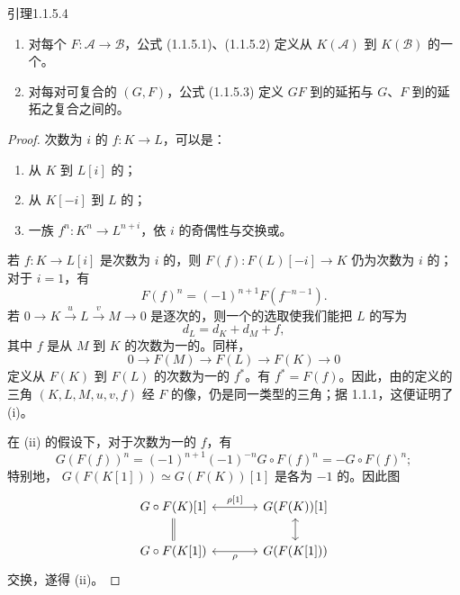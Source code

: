 \begin{SGAresult}{引理}{1.1.5.4}
\begin{enumerate}
\item[(i)] 对每个 $F:\mathcal A\to\mathcal B$，公式 (1.1.5.1)、(1.1.5.2) 定义从 $K(\mathcal A)$ 到 $K(\mathcal B)$ 的一个。
\item[(ii)] 对每对可复合的 $(G,F)$，公式 (1.1.5.3) 定义 $GF$ 到的延拓与 $G$、$F$ 到的延拓之复合之间的。
\end{enumerate}
\end{SGAresult}
\begin{proof}
次数为 $i$ 的 $f:K\to L$，可以是：
\begin{enumerate}
\item[(a)] 从 $K$ 到 $L[i]$ 的；
\item[(b)] 从 $K[-i]$ 到 $L$ 的；
\item[(c)] 一族 $f^n:K^n\to L^{n+i}$，依 $i$ 的奇偶性与交换或。
\end{enumerate}
若 $f:K\to L[i]$ 是次数为 $i$ 的，则 $F(f):F(L)[-i]\to K$ 仍为次数为 $i$ 的；对于 $i=1$，有
\[
F(f)^n=(-1)^{n+1}F(f^{-n-1}).\tag{1.1.5.5}
\]
若 $0\to K\xrightarrow{u}L\xrightarrow{v}M\to0$ 是逐次的，则一个的选取使我们能把 $L$ 的写为
\[
d_L=d_K+d_M+f,
\]
其中 $f$ 是从 $M$ 到 $K$ 的次数为一的。同样，
\[
0\longrightarrow F(M)\longrightarrow F(L)\longrightarrow F(K)\longrightarrow0
\]
定义从 $F(K)$ 到 $F(L)$ 的次数为一的 $f^*$。有 $f^*=F(f)$。因此，由的定义的三角 $(K,L,M,u,v,f)$ 经 $F$ 的像，仍是同一类型的三角；据 1.1.1，这便证明了 (i)。

在 (ii) 的假设下，对于次数为一的 $f$，有
\[
G(F(f))^n=(-1)^{n+1}(-1)^{-n}G\circ F(f)^n=-G\circ F(f)^n;
\]
特别地， $G(F(K[1]))\simeq G(F(K))[1]$ 是各为 $-1$ 的。因此图
\[
\begin{tikzcd}[column sep=large]
G\circ F(K)[1]\arrow[r,leftrightarrow,"{\rho[1]}"]\arrow[d,equal]&G(F(K))[1]\arrow[d,leftrightarrow]\\
G\circ F(K[1])\arrow[r,leftrightarrow,"\rho"']&G(F(K[1]))
\end{tikzcd}
\]
交换，遂得 (ii)。
\end{proof}

